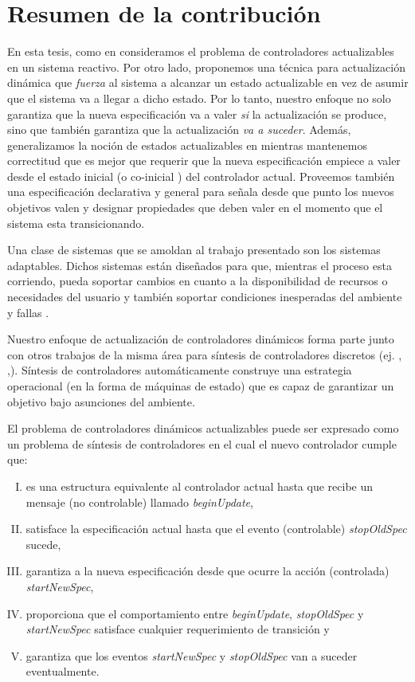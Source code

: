 \section{Resumen de la contribución}

En esta tesis, como en \cite{6224401,PanzicaLaManna:2013:FCC:2487336.2487349} consideramos el problema de controladores
actualizables en un sistema reactivo. Por otro lado, proponemos una técnica para actualización dinámica que
\emph{fuerza} al sistema a alcanzar un estado actualizable en vez de asumir que el sistema va a llegar a dicho estado.
Por lo tanto, nuestro enfoque no solo garantiza que la nueva especificación va a valer \emph{si} la actualización se
produce, sino que también garantiza que la actualización \emph{va a suceder}. Además, generalizamos la noción de estados
actualizables en \cite{6224401,PanzicaLaManna:2013:FCC:2487336.2487349} mientras mantenemos correctitud que es mejor que
requerir que la nueva especificación empiece a valer desde el estado inicial (o co-inicial 
\cite{PanzicaLaManna:2013:FCC:2487336.2487349}) del controlador actual. Proveemos también una especificación declarativa
y general para señala desde que punto los nuevos objetivos valen y designar propiedades que deben valer en el momento
que el sistema esta transicionando. 

Una clase de sistemas que se amoldan al trabajo presentado son los sistemas adaptables. Dichos sistemas están diseñados
para que, mientras el proceso esta corriendo, pueda soportar cambios en cuanto a la disponibilidad de recursos o
necesidades del usuario y también soportar condiciones inesperadas del ambiente y fallas \cite{SEAMS}. 

Nuestro enfoque de actualización de controladores dinámicos forma parte junto con otros trabajos de la misma área para
síntesis de controladores discretos (ej. \cite{21072}, \cite{Piterman},\cite{D'ippolito:2013:SNE:2430536.2430543}).
Síntesis de controladores automáticamente construye una estrategia operacional (en la forma de máquinas de estado) que
es capaz de garantizar un objetivo bajo asunciones del ambiente.

El problema de controladores dinámicos actualizables puede ser expresado como un problema de síntesis de controladores
en el cual el nuevo controlador cumple que:

\begin{enumerate}[I)]
\item es una estructura equivalente al controlador actual hasta que recibe un mensaje (no controlable) llamado
\emph{beginUpdate},
\item  satisface la especificación actual hasta que el evento (controlable) \emph{stopOldSpec} sucede,
\item garantiza a la nueva especificación desde que ocurre la acción (controlada) \emph{startNewSpec},
\item proporciona que el comportamiento entre \emph{beginUpdate}, \emph{stopOldSpec} y \emph{startNewSpec} satisface
cualquier requerimiento de transición y
\item garantiza que los eventos \emph{startNewSpec} y \emph{stopOldSpec} van a suceder eventualmente.
\end{enumerate}


